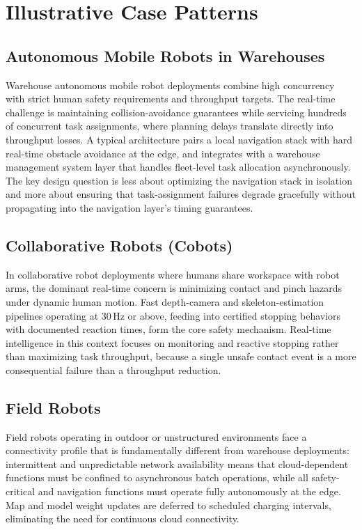 \documentclass[smallextended]{svjour3}
\begin{document}
\section{Illustrative Case Patterns}
\label{sec:cases}

\subsection{Autonomous Mobile Robots in Warehouses}

Warehouse autonomous mobile robot deployments combine high concurrency with strict human safety requirements and throughput targets. The real-time challenge is maintaining collision-avoidance guarantees while servicing hundreds of concurrent task assignments, where planning delays translate directly into throughput losses. A typical architecture pairs a local navigation stack with hard real-time obstacle avoidance at the edge, and integrates with a warehouse management system layer that handles fleet-level task allocation asynchronously. The key design question is less about optimizing the navigation stack in isolation and more about ensuring that task-assignment failures degrade gracefully without propagating into the navigation layer's timing guarantees.

\subsection{Collaborative Robots (Cobots)}

In collaborative robot deployments where humans share workspace with robot arms, the dominant real-time concern is minimizing contact and pinch hazards under dynamic human motion. Fast depth-camera and skeleton-estimation pipelines operating at 30\,Hz or above, feeding into certified stopping behaviors with documented reaction times, form the core safety mechanism. Real-time intelligence in this context focuses on monitoring and reactive stopping rather than maximizing task throughput, because a
single unsafe contact event is a more consequential failure than a throughput reduction.

\subsection{Field Robots}

Field robots operating in outdoor or unstructured environments face a connectivity profile that is fundamentally different from warehouse deployments: intermittent and unpredictable network availability means that cloud-dependent functions must be confined to asynchronous batch operations, while all safety-critical and navigation functions must operate fully autonomously at the edge. Map and model weight updates are deferred to scheduled charging intervals, eliminating the need for continuous cloud connectivity.
\end{document}
